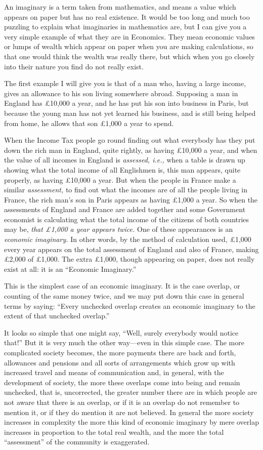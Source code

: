 \documentclass{book}
\begin{document}
An imaginary is a term taken from mathematics, and means a value which appears on paper but has no real existence. It would be too long and much too puzzling to explain what imaginaries in mathematics are, but I can give you a very simple example of what they are in Economics. They mean economic values or lumps of wealth which appear on paper when you are making calculations, so that one would think the wealth was really there, but which when you go closely into their nature you find do not really exist.

The first example I will give you is that of a man who, having a large income, gives an allowance to his son living somewhere abroad. Supposing a man in England has £10,000 a year, and he has put his son into business in Paris, but because the young man has not yet learned his business, and is still being helped from home, he allows that son £1,000 a year to spend.

When the Income Tax people go round finding out what everybody has they put down the rich man in England, quite rightly, as having £10,000 a year, and when the value of all incomes in England is \emph{assessed, i.e.,} when a table is drawn up showing what the total income of all Englishmen is, this man appears, quite properly, as having £10,000 a year. But when the people in France make a similar \emph{assessment,} to find out what the incomes are of all the people living in France, the rich man’s son in Paris appears as having £1,000 a year. So when the assessments of England and France are added together and some Government economist is calculating what the total income of the citizens of both countries may be, \emph{that £1,000 a year appears twice.} One of these appearances is an \emph{economic imaginary.} In other words, by the method of calculation used, £1,000 every year appears on the total assessment of England and also of France, making £2,000 of £1,000. The extra £1,000, though appearing on paper, does not really exist at all: it is an “Economic Imaginary.”

This is the simplest case of an economic imaginary. It is the case overlap, or counting of the same money twice, and we may put down this case in general terms by saying: “Every unchecked overlap creates an economic imaginary to the extent of that unchecked overlap.”

It looks so simple that one might say, “Well, surely everybody would notice that!” But it is very much the other way—even in this simple case. The more complicated society becomes, the more payments there are back and forth, allowances and pensions and all sorts of arrangements which grow up with increased travel and means of communication and, in general, with the development of society, the more these overlaps come into being and remain unchecked, that is, uncorrected, the greater number there are in which people are not aware that there is an overlap, or if it is an overlap do not remember to mention it, or if they do mention it are not believed. In general the more society increases in complexity the more this kind of economic imaginary by mere overlap increases in proportion to the total real wealth, and the more the total “assessment” of the community is exaggerated.
\end{document}
